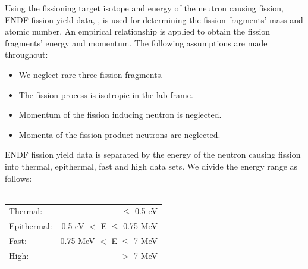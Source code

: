 \documentclass{anstrans}
\begin{document}
Using the fissioning target isotope and energy of the neutron causing fission, ENDF fission yield data, \cite{ENDFManual}, is used for determining the fission fragments' mass and atomic number. An empirical relationship is applied to obtain the fission fragments' energy and momentum.
The following assumptions are made throughout:
\begin{itemize}
  \item We neglect rare three fission fragments.
  \item The fission process is isotropic in the lab frame.
  \item Momentum of the fission inducing neutron is neglected.
  \item Momenta of the fission product neutrons are neglected.
\end{itemize}

ENDF fission yield data is separated by the energy of the neutron causing fission into thermal, epithermal, fast and high data sets. We divide the energy range as follows:\\\\
\begin{tabular}{  l  r }
  Thermal:    & $\le$ 0.5 eV \\
  Epithermal: & 0.5 eV $<$ E $\le$ 0.75 MeV \\
  Fast:       & 0.75 MeV $<$ E $\le$ 7 MeV \\
  High:       & $>$ 7 MeV \\
\end{tabular}\\\\
\end{document}
